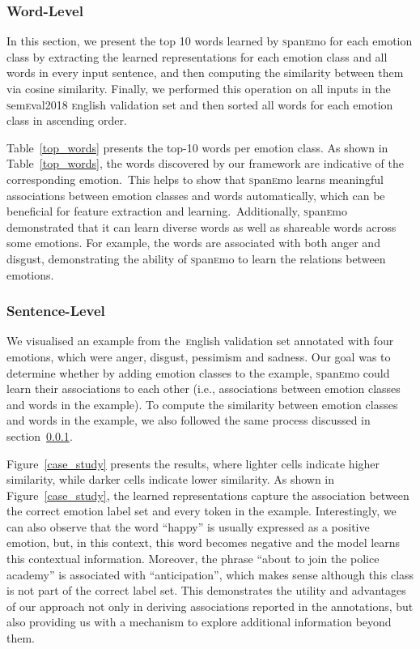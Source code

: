 \documentclass[11pt,a4paper]{article}
\begin{document}
\subsubsection{Word-Level}\label{word_level}


In this section, we present the top 10 words learned by \textsc{s}pan\textsc{e}mo for each emotion class by extracting the learned representations for each emotion class and all words in every input sentence, and then computing the similarity between them via cosine similarity. Finally, we performed this operation on all inputs in the \textsc{s}em\textsc{e}val2018 \textsc{e}nglish validation set and then sorted all words for each emotion class in ascending order. 

Table~\ref{top_words} presents the top-10 words per emotion class. As shown in Table~\ref{top_words}, the words discovered by our framework are indicative of the corresponding emotion.~This helps to show that \textsc{s}pan\textsc{e}mo learns meaningful associations between emotion classes and words automatically, which can be beneficial for feature extraction and learning.~Additionally, \textsc{s}pan\textsc{e}mo demonstrated that it can learn diverse words as well as shareable words across some emotions. For example, the words  are associated with both anger and disgust, demonstrating the ability of \textsc{s}pan\textsc{e}mo to learn the relations between emotions. 



\subsubsection{Sentence-Level}We visualised an example from the~\textsc{e}nglish validation set annotated with four emotions, which were anger, disgust, pessimism and sadness. Our goal was to determine whether by adding emotion classes to the example, \textsc{s}pan\textsc{e}mo could learn their associations to each other (i.e., associations between emotion classes and words in the example). To compute the similarity between emotion classes and words in the example, we also followed the same process discussed in section~\ref{word_level}. 

Figure~\ref{case_study} presents the results, where lighter cells indicate higher similarity, while darker cells indicate lower similarity. As shown in Figure~\ref{case_study}, the learned representations capture the association between the correct emotion label set and every token in the example. Interestingly, we can also observe that the word ``happy'' is usually expressed as a positive emotion, but, in this context, this word becomes negative and the model learns this contextual information. Moreover, the phrase ``about to join the police academy'' is associated with ``anticipation'', which makes sense although this class is not part of the correct label set. This demonstrates the utility and advantages of our approach not only in deriving associations reported in the annotations, but also providing us with a mechanism to explore additional information beyond them.  
\end{document}
